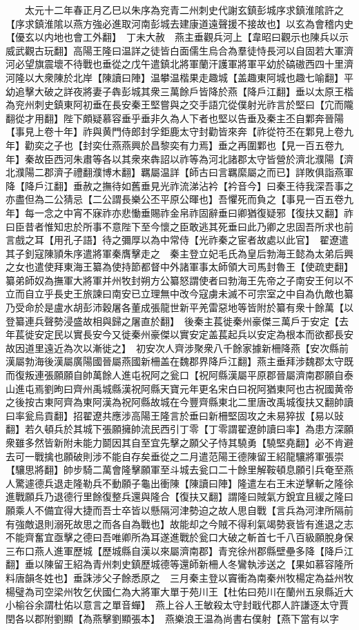 　　太元十二年春正月乙巳以朱序為兖青二州刺史代謝玄鎮彭城序求鎮淮隂許之【序求鎮淮隂以燕方強必進取河南彭城去建康道遠聲援不接故也】以玄為會稽内史【優玄以内地也會工外翻】　丁未大赦　燕主垂觀兵河上【韋昭曰觀示也陳兵以示威武觀古玩翻】高陽王隆曰温詳之徒皆白面儒生烏合為羣徒恃長河以自固若大軍濟河必望旗震壞不待戰也垂從之戊午遣鎮北將軍蘭汗護軍將軍平幼於碻磝西四十里濟河隆以大衆陳於北岸【陳讀曰陣】温攀温楷果走趣城【盖趣東阿城也趣七喻翻】平幼追擊大破之詳夜將妻子犇彭城其衆三萬餘戶皆降於燕【降戶江翻】垂以太原王楷為兖州刺史鎮東阿初垂在長安秦王堅嘗與之交手語宂從僕射光祚言於堅曰【宂而隴翻從才用翻】陛下頗疑慕容垂乎垂非久為人下者也堅以告垂及秦主丕自鄴奔晉陽【事見上卷十年】祚與黄門侍郎封孚鉅鹿太守封勸皆來奔【祚從符丕在鄴見上卷九年】勸奕之子也【封奕仕燕燕興於昌黎奕有力焉】垂之再圍鄴也【見一百五卷九年】秦故臣西河朱肅等各以其衆來犇詔以祚等為河北諸郡太守皆營於濟北濮陽【濟北濮陽二郡濟子禮翻濮博木翻】羈屬温詳【師古曰言羈縻屬之而已】詳敗俱詣燕軍降【降戶江翻】垂赦之撫待如舊垂見光祚流涕沾衿【衿音今】曰秦王待我深吾事之亦盡但為二公猜忌【二公謂長樂公丕平原公暉也】吾懼死而負之【事見一百五卷九年】每一念之中宵不寐祚亦悲慟垂賜祚金帛祚固辭垂曰卿猶復疑邪【復扶又翻】祚曰臣昔者惟知忠於所事不意陛下至今懷之臣敢逃其死垂曰此乃卿之忠固吾所求也前言戲之耳【用孔子語】待之彌厚以為中常侍【光祚秦之宦者故處以此官】　翟遼遣其子釗寇陳頴朱序遣將軍秦膺擊走之　秦主登立妃毛氏為皇后勃海王懿為太弟后興之女也遣使拜東海王纂為使持節都督中外諸軍事太師領大司馬封魯王【使疏吏翻】纂弟師奴為撫軍大將軍并州牧封朔方公纂怒謂使者曰勃海王先帝之子南安王何以不立而自立乎長史王旅諫曰南安已立理無中改今寇虜未滅不可宗室之中自為仇敵也纂乃受命於是盧水胡彭沛穀屠各董成張龍世新平羌雷惡地等皆附於纂有衆十餘萬【以登纂連兵聲勢浸盛故相與歸之屠直於翻】　後秦主萇徙秦州豪傑三萬戶于安定【去年萇徙安定民以實長安今又徙秦州豪傑以實安定盖萇起兵以安定為根本而欲都長安故因道里遠近為次以漸徙之】　初安次人齊涉聚衆八千餘家據新柵降燕【安次縣前漢屬勃海後漢屬廣陽國晉屬燕國新柵盖在魏郡界降戶江翻】燕主垂拜涉魏郡太守既而復叛連張願願自帥萬餘人進屯祝阿之瓮口【祝阿縣漢屬平原郡晉屬濟南郡願自泰山進屯焉劉昫曰齊州禹城縣漢祝阿縣天寶元年更名宋白曰祝阿猶東阿也古祝國黄帝之後按古東阿齊為東阿漢為祝阿縣故城在今豐齊縣東北二里唐改禹城復扶又翻帥讀曰率瓮烏貢翻】招翟遼共應涉高陽王隆言於垂曰新柵堅固攻之未易猝拔【易以䜴翻】若久頓兵於其城下張願擁帥流民西引丁零【丁零謂翟遼帥讀曰率】為患方深願衆雖多然皆新附未能力鬬因其自至宜先擊之願父子恃其驍勇【驍堅堯翻】必不肯避去可一戰擒也願破則涉不能自存矣垂從之二月遣范陽王德陳留王紹龍驤將軍張崇【驤思將翻】帥步騎二萬會隆擊願軍至斗城去瓮口二十餘里解鞍頓息願引兵奄至燕人驚遽德兵退走隆勒兵不動願子龜出衝陳【陳讀曰陣】隆遣左右王末逆擊斬之隆徐進戰願兵乃退德行里餘復整兵還與隆合【復扶又翻】謂隆曰賊氣方銳宜且緩之隆曰願乘人不備宜得大捷而吾士卒皆以懸隔河津勢迫之故人思自戰【言兵為河津所隔前有強敵退則溺死故思之而各自為戰也】故能却之今賊不得利氣竭勢衰皆有進退之志不能齊奮宜亟擊之德曰吾唯卿所為耳遂進戰於瓮口大破之斬首七千八百級願脫身保三布口燕人進軍歷城【歷城縣自漢以來屬濟南郡】青兖徐州郡縣壁壘多降【降戶江翻】垂以陳留王紹為青州刺史鎮歷城德等還師新柵人冬鸞執涉送之【果如慕容隆所料唐韻冬姓也】垂誅涉父子餘悉原之　三月秦主登以竇衝為南秦州牧楊定為益州牧楊璧為司空梁州牧乞伏國仁為大將軍大單于苑川王【杜佑曰苑川在蘭州五泉縣近大小榆谷余謂杜佑以意言之單音蟬】　燕上谷人王敏殺太守封戢代郡人許謙逐太守賈閏各以郡附劉顯【為燕擊劉顯張本】　燕樂浪王温為尚書右僕射【燕下當有以字